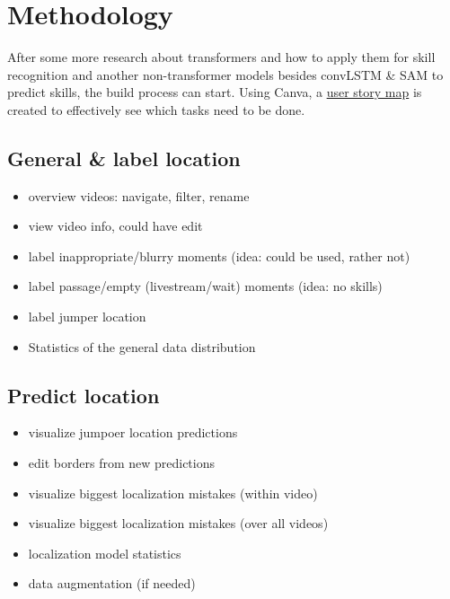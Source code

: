 \section{Methodology}%
\label{sec:methodoly}

After some more research about transformers and how to apply them for skill recognition and another non-transformer models besides convLSTM \& SAM to predict skills, the build process can start.
Using Canva, a \href{https://www.canva.com/design/DAGVz44QCgc/\_Mr9BrOqwwdy9cf-ieYFVg/edit?utm\_content=DAGVz44QCgc\&utm\_campaign=designshare\&utm\_medium=link2\&utm\_source=sharebutton}{user story map} is created to effectively see which tasks need to be done.

\subsection{General \& label location}

\begin{itemize}
    \item overview videos: navigate, filter, rename
    \item view video info, could have edit
    \item label inappropriate/blurry moments (idea: could be used, rather not)
    \item label passage/empty (livestream/wait) moments (idea: no skills)
    \item label jumper location
    \item Statistics of the general data distribution
\end{itemize}

\subsection{Predict location}

\begin{itemize}
    \item visualize jumpoer location predictions
    \item edit borders from new predictions
    \item visualize biggest localization mistakes (within video)
    \item visualize biggest localization mistakes (over all videos)
    \item localization model statistics
    \item data augmentation (if needed)
\end{itemize}

